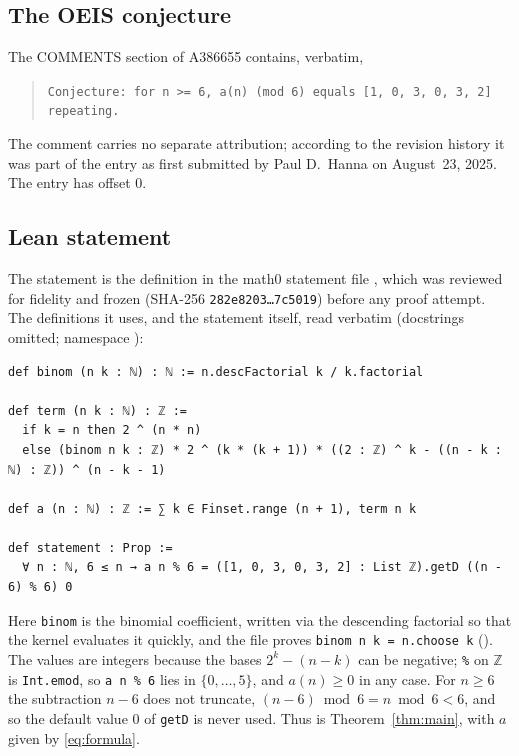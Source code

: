 \documentclass[11pt]{amsart}
\theoremstyle{plain}
\theoremstyle{definition}
\newcommand{\Z}{\mathbb{Z}}
\begin{document}
\subsection*{The OEIS conjecture}
The COMMENTS section of A386655 contains, verbatim,
\begin{quote}
\footnotesize\texttt{Conjecture: for n >= 6, a(n) (mod 6) equals [1, 0, 3, 0, 3, 2] repeating.}
\end{quote}
The comment carries no separate attribution; according to the revision history it was part of the entry as first submitted by Paul D.~Hanna on August~23, 2025.
The entry has offset $0$.

\subsection*{Lean statement}
The statement is the definition  in the math0 statement file , which was reviewed for fidelity and frozen (SHA-256 \texttt{282e8203\ldots7c5019}) before any proof attempt.
The definitions it uses, and the statement itself, read verbatim (docstrings omitted; namespace ):
\begin{lstlisting}
def binom (n k : ℕ) : ℕ := n.descFactorial k / k.factorial

def term (n k : ℕ) : ℤ :=
  if k = n then 2 ^ (n * n)
  else (binom n k : ℤ) * 2 ^ (k * (k + 1)) * ((2 : ℤ) ^ k - ((n - k : ℕ) : ℤ)) ^ (n - k - 1)

def a (n : ℕ) : ℤ := ∑ k ∈ Finset.range (n + 1), term n k

def statement : Prop :=
  ∀ n : ℕ, 6 ≤ n → a n % 6 = ([1, 0, 3, 0, 3, 2] : List ℤ).getD ((n - 6) % 6) 0
\end{lstlisting}
Here \texttt{binom} is the binomial coefficient, written via the descending factorial so that the kernel evaluates it quickly, and the file proves \texttt{binom n k = n.choose k} ().
The values are integers because the bases $2^k-(n-k)$ can be negative; \texttt{\%} on $\Z$ is \texttt{Int.emod}, so \texttt{a n \% 6} lies in $\{0,\dots,5\}$, and $a(n)\ge0$ in any case.
For $n\ge6$ the subtraction $n-6$ does not truncate, $(n-6)\bmod6=n\bmod6<6$, and so the default value $0$ of \texttt{getD} is never used.
Thus  is Theorem~\ref{thm:main}, with $a$ given by \eqref{eq:formula}.
\end{document}
